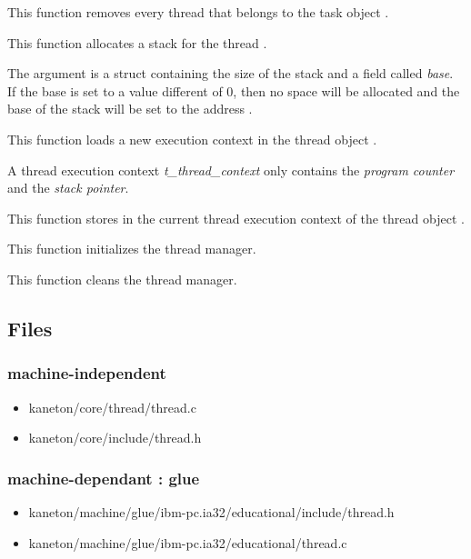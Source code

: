 {
  This function removes every thread that belongs to the
  task object .
}

{
  This function allocates a stack for the thread .

  The  argument is a struct containing the
  size of the stack and a field called \emph{base}. If the
  base is set to a value different of 0, then no space will
  be allocated and the base of the stack will be set to the
  address .
}

{
  This function loads a new execution context in the thread
  object .

  A thread execution context \textit{t\_thread\_context}
  only contains the \textit{program counter} and the
  \textit{stack pointer}.
}

{
  This function stores in  the current
  thread execution context of the thread object .
}

{
  This function initializes the thread manager.
}

{
  This function cleans the thread manager.
}

\newpage

\subsection*{Files}

\subsubsection{\color{filerefcolor} machine-independent}
\begin{itemize}
\item kaneton/core/thread/thread.c
\item kaneton/core/include/thread.h
\end{itemize}

\subsubsection{\color{filerefcolor} machine-dependant : glue}
\begin{itemize}
\item kaneton/machine/glue/ibm-pc.ia32/educational/include/thread.h
\item kaneton/machine/glue/ibm-pc.ia32/educational/thread.c
\end{itemize}

